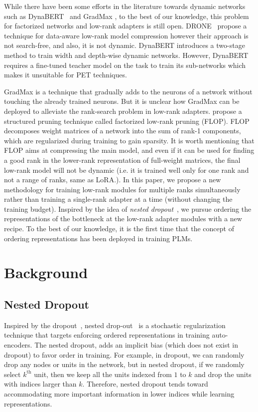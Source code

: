 While there have been some efforts in the literature towards dynamic networks such as DynaBERT~\citep{hou2020dynabert} and GradMax \citep{evci2022gradmax}, to the best of our knowledge, this problem for factorized networks and low-rank adapters is still open. DRONE~\cite{chen2021drone} propose a technique for data-aware low-rank model compression however their approach is not search-free, and also, it is not dynamic. DynaBERT introduces a two-stage method to train width and depth-wise dynamic networks. However, DynaBERT requires a fine-tuned teacher model on the task to train its sub-networks which makes it unsuitable for PET techniques.  

GradMax is a technique that gradually adds to the neurons of a network without touching the already trained neurons. But it is unclear how GradMax can be deployed to alleviate the rank-search problem in low-rank adapters. \citet{wang2019structured} propose a structured pruning technique called factorized low-rank pruning (FLOP). FLOP decomposes weight matrices of a network into the sum of rank-1 components, which are regularized during training to gain sparsity. It is worth mentioning that FLOP aims at compressing the main model, and even if it can be used for finding a good rank in the lower-rank representation of full-weight matrices, the final low-rank model will not be dynamic (i.e. it is trained well only for one rank and not a range of ranks, same as LoRA.). In this paper, we propose a new methodology for training low-rank modules for multiple ranks simultaneously rather than training a single-rank adapter at a time (without changing the training budget). Inspired by the idea of \textit{nested dropout}~\cite{nested_drop}, we pursue ordering the representations of the bottleneck at the low-rank adapter modules with a new recipe. To the best of our knowledge, it is the first time that the concept of ordering representations has been deployed in training PLMs. 

\section{Background }
\subsection{Nested Dropout} Inspired by the dropout~\cite{hinton2012improving}, nested drop-out~\cite{nested_drop} is a stochastic regularization technique that targets enforcing ordered representations in training auto-encoders. The nested dropout, adds an implicit bias (which does not exist in dropout) to favor order in training. For example, in dropout, we can randomly drop any nodes or units in the network, but in nested dropout, if we randomly select $k^{\text{th}}$ unit, then we keep all the units indexed from $1$ to $k$ and drop the units with indices larger than $k$. Therefore, nested dropout tends toward accommodating more important information in lower indices while learning representations.

